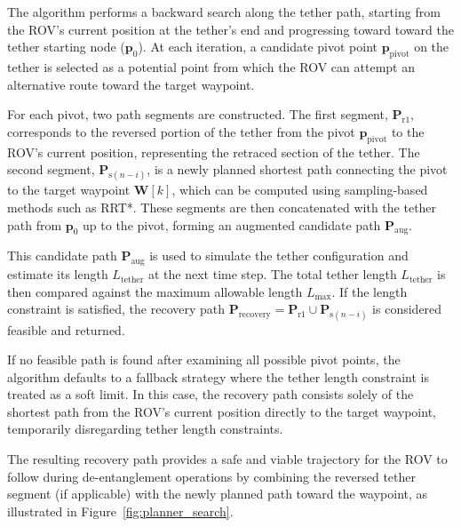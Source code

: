 The algorithm performs a backward search along the tether path, starting from the \ac{ROV}’s current position at the tether’s end and progressing toward toward the tether starting node ($\mathbf{p}_0$). At each iteration, a candidate pivot point \(\mathbf{p}_{\mathrm{pivot}}\) on the tether is selected as a potential point from which the \ac{ROV} can attempt an alternative route toward the target waypoint.

For each pivot, two path segments are constructed. The first segment, \(\mathbf{P}_{\mathrm{r}1}\), corresponds to the reversed portion of the tether from the pivot \(\mathbf{p}_{\mathrm{pivot}}\) to the \ac{ROV}’s current position, representing the retraced section of the tether. The second segment, \(\mathbf{P}_{\mathrm{s}(n - i)}\), is a newly planned shortest path connecting the pivot to the target waypoint \(\mathbf{W}[k]\), which can be computed using sampling-based methods such as RRT*. These segments are then concatenated with the tether path from $\mathbf{p}_0$ up to the pivot, forming an augmented candidate path \(\mathbf{P}_{\mathrm{aug}}\).

This candidate path \(\mathbf{P}_{\mathrm{aug}}\) is used to simulate the tether configuration and estimate its length \(L_{\mathrm{tether}}\) at the next time step. The total tether length \(L_{\mathrm{tether}}\) is then compared against the maximum allowable length \(L_{\max}\). If the length constraint is satisfied, the recovery path \(\mathbf{P}_{\mathrm{recovery}} = \mathbf{P}_{\mathrm{r}1} \cup \mathbf{P}_{\mathrm{s}(n - i)}\) is considered feasible and returned.

If no feasible path is found after examining all possible pivot points, the algorithm defaults to a fallback strategy where the tether length constraint is treated as a soft limit. In this case, the recovery path consists solely of the shortest path from the \ac{ROV}’s current position directly to the target waypoint, temporarily disregarding tether length constraints.

The resulting recovery path provides a safe and viable trajectory for the \ac{ROV} to follow during de-entanglement operations by combining the reversed tether segment (if applicable) with the newly planned path toward the waypoint, as illustrated in Figure~\ref{fig:planner_search}.










